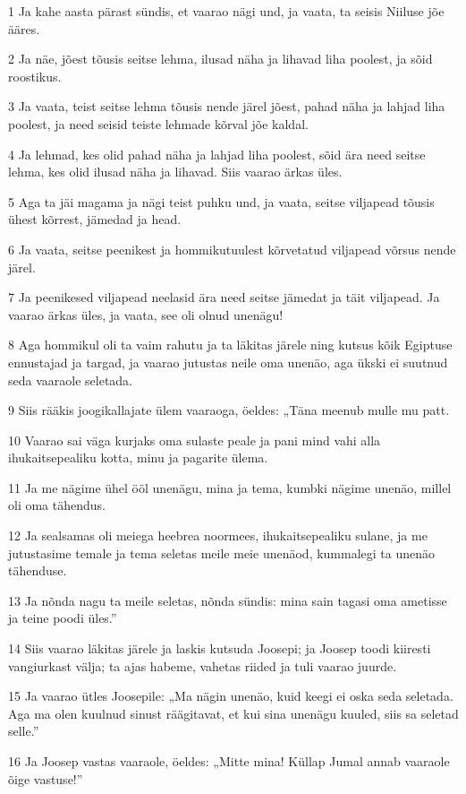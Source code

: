 \par 1 Ja kahe aasta pärast sündis, et vaarao nägi und, ja vaata, ta seisis Niiluse jõe ääres.
\par 2 Ja näe, jõest tõusis seitse lehma, ilusad näha ja lihavad liha poolest, ja sõid roostikus.
\par 3 Ja vaata, teist seitse lehma tõusis nende järel jõest, pahad näha ja lahjad liha poolest, ja need seisid teiste lehmade kõrval jõe kaldal.
\par 4 Ja lehmad, kes olid pahad näha ja lahjad liha poolest, sõid ära need seitse lehma, kes olid ilusad näha ja lihavad. Siis vaarao ärkas üles.
\par 5 Aga ta jäi magama ja nägi teist puhku und, ja vaata, seitse viljapead tõusis ühest kõrrest, jämedad ja head.
\par 6 Ja vaata, seitse peenikest ja hommikutuulest kõrvetatud viljapead võrsus nende järel.
\par 7 Ja peenikesed viljapead neelasid ära need seitse jämedat ja täit viljapead. Ja vaarao ärkas üles, ja vaata, see oli olnud unenägu!
\par 8 Aga hommikul oli ta vaim rahutu ja ta läkitas järele ning kutsus kõik Egiptuse ennustajad ja targad, ja vaarao jutustas neile oma unenäo, aga ükski ei suutnud seda vaaraole seletada.
\par 9 Siis rääkis joogikallajate ülem vaaraoga, öeldes: „Täna meenub mulle mu patt.
\par 10 Vaarao sai väga kurjaks oma sulaste peale ja pani mind vahi alla ihukaitsepealiku kotta, minu ja pagarite ülema.
\par 11 Ja me nägime ühel ööl unenägu, mina ja tema, kumbki nägime unenäo, millel oli oma tähendus.
\par 12 Ja sealsamas oli meiega heebrea noormees, ihukaitsepealiku sulane, ja me jutustasime temale ja tema seletas meile meie unenäod, kummalegi ta unenäo tähenduse.
\par 13 Ja nõnda nagu ta meile seletas, nõnda sündis: mina sain tagasi oma ametisse ja teine poodi üles.”
\par 14 Siis vaarao läkitas järele ja laskis kutsuda Joosepi; ja Joosep toodi kiiresti vangiurkast välja; ta ajas habeme, vahetas riided ja tuli vaarao juurde.
\par 15 Ja vaarao ütles Joosepile: „Ma nägin unenäo, kuid keegi ei oska seda seletada. Aga ma olen kuulnud sinust räägitavat, et kui sina unenägu kuuled, siis sa seletad selle.”
\par 16 Ja Joosep vastas vaaraole, öeldes: „Mitte mina! Küllap Jumal annab vaaraole õige vastuse!”
